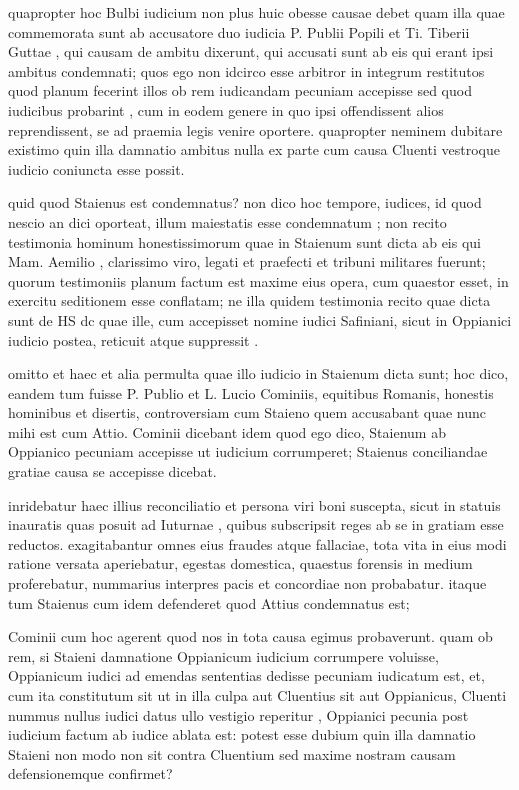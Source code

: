  quapropter hoc Bulbi iudicium non plus huic obesse causae debet quam illa quae commemorata sunt ab accusatore duo iudicia P. Publii Popili et Ti. Tiberii Guttae , qui causam de ambitu dixerunt, qui accusati sunt ab eis qui erant ipsi ambitus condemnati; quos ego non idcirco esse arbitror in integrum restitutos quod planum fecerint illos ob rem iudicandam pecuniam accepisse sed quod iudicibus probarint , cum in eodem genere in quo ipsi offendissent alios reprendissent, se ad praemia legis venire oportere. quapropter neminem dubitare existimo quin illa damnatio ambitus nulla ex parte cum causa Cluenti vestroque iudicio coniuncta esse possit.

 quid quod Staienus est condemnatus? non dico hoc tempore, iudices, id quod nescio an dici oporteat, illum maiestatis esse condemnatum ; non recito testimonia hominum honestissimorum quae in Staienum sunt dicta ab eis qui Mam. Aemilio , clarissimo viro, legati et praefecti et tribuni militares fuerunt; quorum testimoniis planum factum est maxime eius opera, cum quaestor esset, in exercitu seditionem esse conflatam; ne illa quidem testimonia recito quae dicta sunt de HS dc quae ille, cum accepisset nomine iudici Safiniani, sicut in Oppianici iudicio postea, reticuit atque suppressit .

 omitto et haec et alia permulta quae illo iudicio in Staienum dicta sunt; hoc dico, eandem tum fuisse P. Publio et L. Lucio Cominiis, equitibus Romanis, honestis hominibus et disertis, controversiam cum Staieno quem accusabant quae nunc mihi est cum Attio. Cominii dicebant idem quod ego dico, Staienum ab Oppianico pecuniam accepisse ut iudicium corrumperet; Staienus conciliandae gratiae causa se accepisse dicebat.

 inridebatur haec illius reconciliatio et persona viri boni suscepta, sicut in statuis inauratis quas posuit ad Iuturnae , quibus subscripsit reges ab se in gratiam esse reductos. exagitabantur omnes eius fraudes atque fallaciae, tota vita in eius modi ratione versata aperiebatur, egestas domestica, quaestus forensis in medium proferebatur, nummarius interpres pacis et concordiae non probabatur. itaque tum Staienus cum idem defenderet quod Attius condemnatus est;

 Cominii cum hoc agerent quod nos in tota causa egimus probaverunt. quam ob rem, si Staieni damnatione Oppianicum iudicium corrumpere voluisse, Oppianicum iudici ad emendas sententias dedisse pecuniam iudicatum est, et, cum ita constitutum sit ut in illa culpa aut Cluentius sit aut Oppianicus, Cluenti nummus nullus iudici datus ullo vestigio reperitur , Oppianici pecunia post iudicium factum ab iudice ablata est: potest esse dubium quin illa damnatio Staieni non modo non sit contra Cluentium sed maxime nostram causam defensionemque confirmet?

